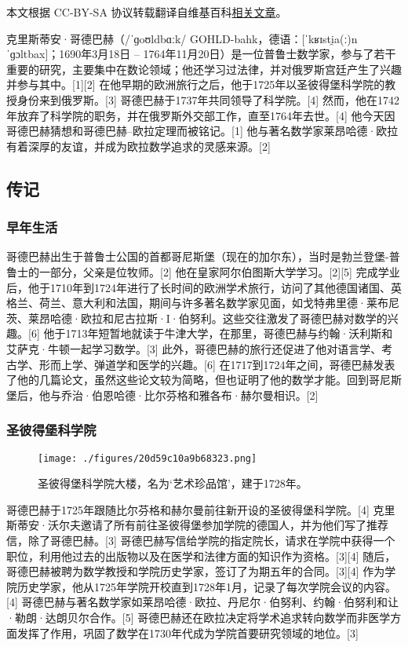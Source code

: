 
本文根据 CC-BY-SA 协议转载翻译自维基百科\href{https://en.wikipedia.org/wiki/Christian_Goldbach}{相关文章}。

克里斯蒂安·哥德巴赫（/ˈɡoʊldbɑːk/ GOHLD-bahk，德语：[ˈkʁɪsti̯a(ː)n ˈɡɔltbax]；1690年3月18日 – 1764年11月20日）是一位普鲁士数学家，参与了若干重要的研究，主要集中在数论领域；他还学习过法律，并对俄罗斯宫廷产生了兴趣并参与其中。[1][2] 在他早期的欧洲旅行之后，他于1725年以圣彼得堡科学院的教授身份来到俄罗斯。[3] 哥德巴赫于1737年共同领导了科学院。[4] 然而，他在1742年放弃了科学院的职务，并在俄罗斯外交部工作，直至1764年去世。[4] 他今天因哥德巴赫猜想和哥德巴赫–欧拉定理而被铭记。[1] 他与著名数学家莱昂哈德·欧拉有着深厚的友谊，并成为欧拉数学追求的灵感来源。[2]
\subsection{传记}  
\subsubsection{早年生活}  
哥德巴赫出生于普鲁士公国的首都哥尼斯堡（现在的加尔东），当时是勃兰登堡-普鲁士的一部分，父亲是位牧师。[2] 他在皇家阿尔伯图斯大学学习。[2][5] 完成学业后，他于1710年到1724年进行了长时间的欧洲学术旅行，访问了其他德国诸国、英格兰、荷兰、意大利和法国，期间与许多著名数学家见面，如戈特弗里德·莱布尼茨、莱昂哈德·欧拉和尼古拉斯·I·伯努利。这些交往激发了哥德巴赫对数学的兴趣。[6] 他于1713年短暂地就读于牛津大学，在那里，哥德巴赫与约翰·沃利斯和艾萨克·牛顿一起学习数学。[3] 此外，哥德巴赫的旅行还促进了他对语言学、考古学、形而上学、弹道学和医学的兴趣。[6] 在1717到1724年之间，哥德巴赫发表了他的几篇论文，虽然这些论文较为简略，但也证明了他的数学才能。回到哥尼斯堡后，他与乔治·伯恩哈德·比尔芬格和雅各布·赫尔曼相识。[2]
\subsubsection{圣彼得堡科学院}
\begin{figure}[ht]
\centering
\texttt{[image: ./figures/20d59c10a9b68323.png]}
\caption{圣彼得堡科学院大楼，名为‘艺术珍品馆’，建于1728年。} \label{fig_Goldba_1}
\end{figure}
哥德巴赫于1725年跟随比尔芬格和赫尔曼前往新开设的圣彼得堡科学院。[4] 克里斯蒂安·沃尔夫邀请了所有前往圣彼得堡参加学院的德国人，并为他们写了推荐信，除了哥德巴赫。[3] 哥德巴赫写信给学院的指定院长，请求在学院中获得一个职位，利用他过去的出版物以及在医学和法律方面的知识作为资格。[3][4] 随后，哥德巴赫被聘为数学教授和学院历史学家，签订了为期五年的合同。[3][4] 作为学院历史学家，他从1725年学院开校直到1728年1月，记录了每次学院会议的内容。[4] 哥德巴赫与著名数学家如莱昂哈德·欧拉、丹尼尔·伯努利、约翰·伯努利和让·勒朗·达朗贝尔合作。[5] 哥德巴赫还在欧拉决定将学术追求转向数学而非医学方面发挥了作用，巩固了数学在1730年代成为学院首要研究领域的地位。[3]
